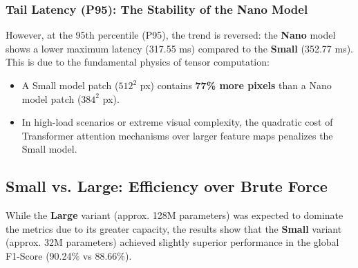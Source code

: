 \subsubsection{Tail Latency (P95): The Stability of the Nano Model}

However, at the 95th percentile (P95), the trend is reversed: the \textbf{Nano} model shows a lower maximum latency (317.55 ms) compared to the \textbf{Small} (352.77 ms). This is due to the fundamental physics of tensor computation:

\begin{itemize}
    \item A Small model patch ($512^2$ px) contains \textbf{77\% more pixels} than a Nano model patch ($384^2$ px).
    \item In high-load scenarios or extreme visual complexity, the quadratic cost of Transformer attention mechanisms over larger feature maps penalizes the Small model.
\end{itemize}

\subsection{Small vs. Large: Efficiency over Brute Force}

While the \textbf{Large} variant (approx. 128M parameters) was expected to dominate the metrics due to its greater capacity, the results show that the \textbf{Small} variant (approx. 32M parameters) achieved slightly superior performance in the global F1-Score (90.24\% vs 88.66\%).

